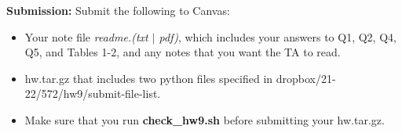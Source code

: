 \documentclass[11pt]{article}
\begin{document}
\vspace{0.5 in}
\noindent
{\bf Submission:}  Submit the following to Canvas:

\begin{itemize}
  \item Your note file {\it readme.(txt $\mid$ pdf)}, which
     includes your answers to Q1, Q2, Q4, Q5, and Tables 1-2, 
     and any notes that you want the TA to read.
      

  \item  hw.tar.gz that includes two python files specified in
      dropbox/21-22/572/hw9/submit-file-list.

  \item Make sure that you run {\bf check\_hw9.sh} before
    submitting your hw.tar.gz.
    
\end{itemize}
\end{document}

